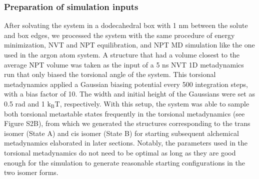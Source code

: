 \documentclass[journal=jacsat,manuscript=article]{achemso}
\begin{document}
\subsubsection{Preparation of simulation inputs}
After solvating the system in a dodecahedral box with 1 nm between the solute and box edges, we processed the system with the same procedure of energy minimization, NVT and NPT equilibration, and NPT MD simulation like the one used in the argon atom system. A structure that had a volume closest to the average NPT volume was taken as the input of a 5 ns NVT 1D metadynamics run that only biased the torsional angle of the system. This torsional metadynamics applied a Gaussian biasing potential every 500 integration steps, with a bias factor of 10. The width and initial height of the Gaussians were set as 0.5 rad and 1 $\text{k}_{\text{B}}\text{T}$, respectively. With this setup, the system was able to sample both torsional metastable states frequently in the torsional metadynamics (see Figure S2B), from which we generated the structures corresponding to the trans isomer (State A) and cis isomer (State B) for starting subsequent alchemical metadynamics elaborated in later sections. Notably, the parameters used in the torsional metadynamics do not need to be optimal as long as they are good enough for the simulation to generate reasonable starting configurations in the two isomer forms.
\end{document}
